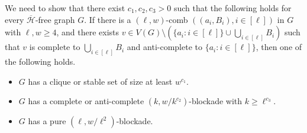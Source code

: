 \documentclass[a4paper,11pt]{article}
\let\oldendproof\endproof
\renewenvironment{proof}[1][\proofname]{%
	\oldproof[\normalfont\bfseries #1]%
}{\oldendproof}
\begin{document}
    
    \begin{proof}
    We need to show that
    there exist $c_1,c_2,c_3>0$ such that the following holds for every $\overline{\mathcal{H}}$-free graph $G$. 
    If there is a $(\ell,w)$-comb $((a_i,B_i),i\in[\ell])$ in $G$ with $\ell,w\geq 4$, and there exists $v\in V(G)\setminus(\{a_i:i\in[\ell]\}\cup\bigcup_{i\in[\ell]}B_i)$ such that $v$ is complete to $\bigcup_{i\in[\ell]}B_i$ and anti-complete to $\{a_i:i\in[\ell]\}$, then one of the following holds.
    
        \begin{itemize}
            
            \item[$(a)$] $G$ has a clique or stable set of size at least $w^{c_1}$.
            
            \item[$(b)$] $G$ has a complete or anti-complete $(k,w/k^{c_2})$-blockade with $k\geq \ell^{c_3}$.
            
            \item[$(c)$] $G$ has a pure $(\ell,w/\ell^{2})$-blockade.

        \end{itemize}
        

\end{proof}
\end{document}
